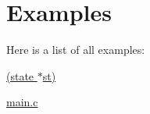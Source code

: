 \section{Examples}
Here is a list of all examples\+:\begin{DoxyCompactItemize}
\item 
\hyperlink{emucharts_fcusoftware__misra_c_8c-example}{(state $\ast$st)}
\item 
\hyperlink{main_8c-example}{main.\+c}
\end{DoxyCompactItemize}
